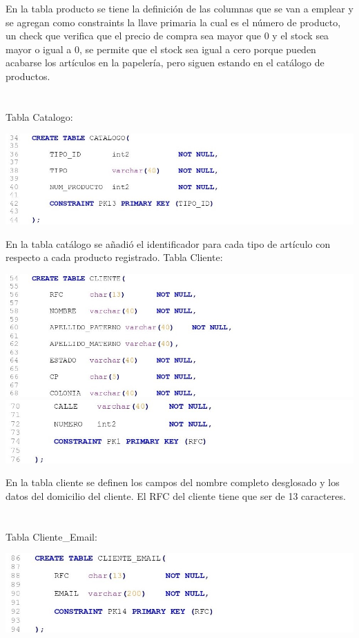 \documentclass[letter,12pt]{article} %
\begin{document}
En la tabla producto se tiene la definición de las columnas que se van a emplear y se agregan como constraints la llave primaria la cual es el número de producto, un check que verifica que el precio de compra sea mayor que 0 y el stock sea mayor o igual a 0, se permite que el stock sea igual a cero porque pueden acabarse los artículos en la papelería, pero siguen estando en el catálogo de productos.
\\\\\\
Tabla Catalogo:
\begin{center} 
\includegraphics[scale=0.90]{imagenes/DDL02.jpg}
\end{center}
En la tabla catálogo se añadió el identificador para cada tipo de artículo con respecto a cada  producto registrado. 
\newpage
Tabla Cliente:
\begin{center} 
\includegraphics[scale=0.90]{imagenes/DDL03-1.jpg}
\includegraphics[scale=0.90]{imagenes/DDL03-2.jpg}
\end{center}
En la tabla cliente se definen los campos del nombre completo desglosado y los datos del domicilio del cliente. El RFC del cliente tiene que ser de 13 caracteres.
\\\\\\
Tabla Cliente\_Email:
\begin{center} 
\includegraphics[scale=0.90]{imagenes/DDL04.jpg}
\end{center}
\end{document}
